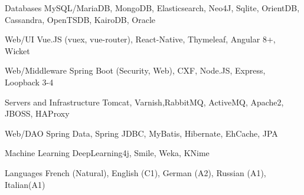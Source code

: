 \begin{cvskills}
  \cvskill
  {Databases} %
  {MySQL/MariaDB, MongoDB, Elasticsearch, Neo4J, Sqlite, OrientDB, Cassandra, OpenTSDB, KairoDB, Oracle} %
  
  \cvskill
  {Web/UI} %
  {Vue.JS (vuex, vue-router), React-Native, Thymeleaf, Angular 8+, Wicket} %
  
  \cvskill
  {Web/Middleware} %
  {Spring Boot (Security, Web), CXF, Node.JS, Express, Loopback 3-4} %

  \cvskill
  {Servers and Infrastructure} %
  {Tomcat, Varnish,RabbitMQ, ActiveMQ, Apache2, JBOSS, HAProxy} %

  
  \cvskill
  {Web/DAO} %
  {Spring Data, Spring JDBC, MyBatis, Hibernate, EhCache, JPA} %

  \cvskill
  {Machine Learning} %
  {DeepLearning4j, Smile, Weka, KNime} %
  

  \cvskill
  {Languages} %
  {French (Natural), English (C1), German (A2), Russian (A1), Italian(A1)} %

\end{cvskills}
